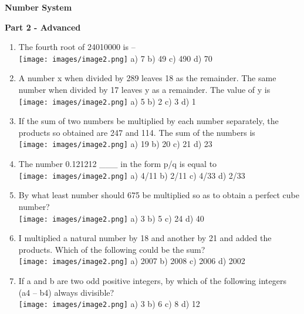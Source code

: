 \documentclass[
]{article}
\author{}
\date{}
\begin{document}
\begin{center}
	{\Large \textbf{Number System}}
\end{center}


\textbf{Part 2 - Advanced \\}

\begin{enumerate}
	\item The fourth root of 24010000 is --\\
	\texttt{[image: images/image2.png]} a) 7 b) 49 c) 490 d) 70
	
	\item A number x when divided by 289 leaves 18 as the remainder. The same number when divided by 17 leaves y as a remainder. The value of y is\\
	\texttt{[image: images/image2.png]} a) 5 b) 2 c) 3 d) 1
	
	\item If the sum of two numbers be multiplied by each number separately, the products so obtained are 247 and 114. The sum of the numbers is\\
	\texttt{[image: images/image2.png]} a) 19 b) 20 c) 21 d) 23
	
	\item The number 0.121212 \_\_\_ in the form p/q is equal to\\
	\texttt{[image: images/image2.png]} a) 4/11 b) 2/11 c) 4/33 d) 2/33
	
	\item By what least number should 675 be multiplied so as to obtain a perfect cube number?\\
	\texttt{[image: images/image2.png]} a) 3 b) 5 c) 24 d) 40
	
	\item I multiplied a natural number by 18 and another by 21 and added the products. Which of the following could be the sum? \\
	\texttt{[image: images/image2.png]} a) 2007 b) 2008 c) 2006 d) 2002
	
	\item If a and b are two odd positive integers, by which of the following integers (a4 -- b4) always divisible? \\
	\texttt{[image: images/image2.png]} a) 3 b) 6 c) 8 d) 12
	

\end{enumerate}
\end{document}
